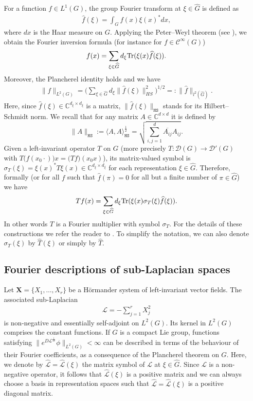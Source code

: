 \documentclass[12pt,oneside,a4paper]{book}
\numberwithin{equation}{section}     %
\theoremstyle{plain}
\theoremstyle{definition}
\newcommand{\C}{{\mathbb C}}
\newcommand{\slp}{{\mathcal L}}
\newcommand{\HS}{{\mathtt{HS}}}
\newcommand{\Gh}{{\widehat{G}}}
\begin{document}
For a function $f\in L^1(G)$, the group Fourier transform at $\xi\in\Gh$ is defined as 
\begin{align*}
\widehat{f}(\xi)=\int_G f(x)\xi(x)^* dx,
\end{align*}
where $dx$ is the Haar measure on $G$. Applying the Peter--Weyl theorem (see \cite{RT2009}), we obtain the Fourier inversion formula (for instance for $f\in\mathcal{C}^\infty(G)$)
$$
f(x)=\sum_{\xi\in\Gh} d_\xi {\rm Tr}(\xi(x) \widehat{f}(\xi)).
$$
Moreover, the Plancherel identity holds and we have
\begin{align*}
\|f\|_{L^2(G)}=\Big(\sum_{\xi\in\Gh}d_{\xi}\|\widehat{f}(\xi)\|^2_{HS}\Big)^{1/2}=:\|\widehat{f}\|_{l^2(\Gh)}.
\end{align*}
Here, since $\widehat {f}(\xi)\in\C^{d_\xi\times d_\xi}$ is a matrix, $\|\widehat {f}(\xi)\|_{\HS}$ stands for its Hilbert--Schmidt norm. We recall that for any matrix $A\in\C^{d\times d}$ it is defined by 
\[
\|A\|_{\HS}:=\langle A,A\rangle_{\HS}^{\frac{1}{2}}=\sqrt{\sum_{i,j=1}^d \overline{A_{ij}}A_{ij}}.
\]
Given a left-invariant operator $T$ on $G$ (more precisely $T:\mathcal{D}(G)\rightarrow\mathcal{D}'(G)$ with $T\big(f(x_0\cdot)\big)x=\big(Tf\big)(x_0x)$), its matrix-valued symbol is $\sigma_T(\xi)=\xi(x)^* T\xi(x)\in \C^{d_\xi\times d_\xi}$ for each representation $\xi\in \Gh$. Therefore, formally (or for all $f$ such that $\widehat{f}(\pi)=0$ for all but a finite number of $\pi\in\Gh$) we have
$$
Tf(x)=\sum_{\xi\in\Gh} d_\xi {\rm Tr}(\xi(x)\sigma_T(\xi) \widehat{f}(\xi)).
$$
In other words $T$ is a Fourier multiplier with symbol $\sigma_T$.
For the details of these constructions we refer the reader to \cite{RT2009,RT2013, T1986}.
To simplify the notation, we can also denote $\sigma_T(\xi)$ by $\widehat{T}(\xi)$ or simply by $\widehat{T}$.

\subsection{Fourier descriptions of sub-Laplacian spaces}

Let $\mathbf{X}=\{X_1,\dots,X_r\}$ be a H\"ormander system of left-invariant vector fields. The associated sub-Laplacian
\begin{align*}
\slp=-\sum_{j=1}^rX_j^2 
\end{align*}
is non-negative and essentially self-adjoint on $L^2(G)$. Its kernel in $L^2(G)$ comprises the constant functions.
If $G$ is a compact Lie group, functions satisfying $\|e^{D\slp^{\frac{1}{2s}}}\phi\|_{L^2(G)}<\infty$ can be described in terms of the behaviour of their Fourier coefficients, as a consequence of the Plancherel theorem on $G$. Here, we denote by $\widehat\slp=\widehat\slp(\xi)$ the matrix symbol of $\slp$ at $\xi\in\Gh$. Since $\slp$ is a non-negative operator, it follows that $\widehat{\slp}(\xi)$ is a positive matrix and we can always choose a basis in representation spaces such that $\widehat\slp=\widehat\slp(\xi)$ is a positive diagonal matrix.
\end{document}
